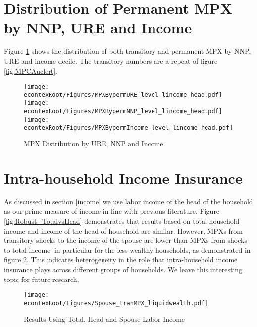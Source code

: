 \documentclass[titlepage]{\econtex}\newcommand{\texname}{ConsumptionHeterogeneity}
\begin{document}
\section{Distribution of Permanent MPX by NNP, URE and Income} \label{PermMPXbyURENNP}
\setcounter{figure}{0}   
\setcounter{table}{0} 
Figure \ref{fig:MPCAuclert_perm} shows the distribution of both transitory and permanent MPX by NNP, URE and income decile. The transitory numbers are a repeat of figure \ref{fig:MPCAuclert}.
\begin{figure} 
	\begin{centering}
		\texttt{[image: \\econtexRoot/Figures/MPXBypermURE\_level\_lincome\_head.pdf]}
		\texttt{[image: \\econtexRoot/Figures/MPXBypermNNP\_level\_lincome\_head.pdf]}
		\texttt{[image: \\econtexRoot/Figures/MPXBypermIncome\_level\_lincome\_head.pdf]}
		\caption{MPX Distribution by URE, NNP and Income}
		\label{fig:MPCAuclert_perm}
	\end{centering}
\end{figure}

\section{Intra-household Income Insurance} \label{Insurance}
\setcounter{figure}{0}   
\setcounter{table}{0} 
As discussed in section \ref{income} we use labor income of the head of the household as our prime measure of income in line with previous literature. Figure \ref{fig:Robust_TotalvsHead} demonstrates that results based on total household income and income of the head of household are similar. However, MPXs from transitory shocks to the income of the spouse are lower than MPXs from shocks to total income, in particular for the less wealthy households, as demonstrated in figure \ref{fig:Robust_Spouse}. This indicates heterogeneity in the role that intra-household income insurance plays across different groups of households. We leave this interesting topic for future research. 


\begin{figure} 
	\begin{centering}
		\texttt{[image: \\econtexRoot/Figures/Spouse\_tranMPX\_liquidwealth.pdf]}
		\caption{Results Using Total, Head and Spouse Labor Income}
		\label{fig:Robust_Spouse}
	\end{centering}
\end{figure}



\end{document}
